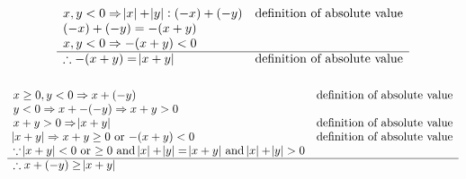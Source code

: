\documentclass[letterpaper]{article}
\begin{document}
        \subsubsection{}
        	\begin{displaymath}
        		\begin{array}{ll}
        			x, y < 0 \Rightarrow \abs{x} + \abs{y}: (-x) + (-y) & $definition of absolute value$\\
                    (-x) + (-y) = -(x + y) &\\
                    x, y < 0 \Rightarrow -(x + y) < 0 &\\ 
                    \hline
                    \therefore -(x + y) = \abs{x + y} & $definition of absolute value$\\
        		\end{array}
        	\end{displaymath}
        \subsubsection{}
        	\begin{displaymath}
        		\begin{array}{ll}
                	x \geq 0, y < 0 \Rightarrow x + (-y) & $definition of absolute value$\\
                    y < 0 \Rightarrow x + -(-y) \Rightarrow x + y > 0 &\\
                    x + y > 0 \Rightarrow \abs{x + y} & $definition of absolute value$\\
                    \abs{x + y} \Rightarrow x + y \geq 0 $ or $ -(x + y) < 0 & $definition of absolute value$\\
                    \because \abs{x + y} < 0 $ or $ \geq 0 $ and $ \abs{x} + \abs{y} = \abs{x + y} $ and $ \abs{x} + \abs{y} > 0&\\
                    \hline
                    \therefore x + (-y) \geq \abs{x + y} &\\
                \end{array} 
        	\end{displaymath}
\end{document}
